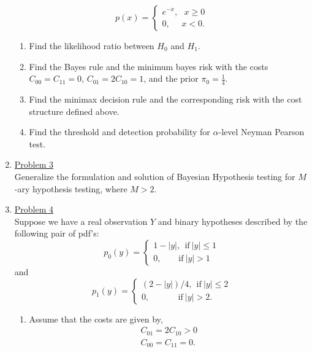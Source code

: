 \documentclass[a4paper,english,10pt]{article}
\begin{document}
\begin{enumerate}
\begin{equation*}
	p(x)=\begin{cases}
		e^{-x},~~~x\geq 0\\
		0,~~~~~~x<0.
	\end{cases}	
\end{equation*}
\begin{enumerate}
\item Find the likelihood ratio between $H_0$ and $H_1$.
\item Find the Bayes rule and the minimum bayes risk with the costs $C_{00}=C_{11}=0$, $C_{01}=2C_{10}=1$, and the prior $\pi_0=\frac{1}{4}$.
\item Find the minimax decision rule and the corresponding risk with the cost structure defined above.
\item Find the threshold and detection probability for $\alpha$-level Neyman Pearson test.
\end{enumerate}
\item \hyperlink{solution3}{Problem 3}\\ 
Generalize the formulation and solution of Bayesian Hypothesis testing for $M$-ary hypothesis testing, where $M>2$.
\item \hyperlink{solution4}{Problem 4}\\
Suppose we have a real observation $Y$ and binary hypotheses described by the following pair of pdf's:
\begin{equation}\nonumber
p_0(y)=\begin{cases}
1-|y|,~~\mbox{if}~|y|\leq 1\\
0,~~~~~~~~~\mbox{if}~|y|> 1
\end{cases}
\end{equation}
and
\begin{equation}\nonumber
p_1(y)=\begin{cases}
(2-|y|)/4,~~\mbox{if}~|y|\leq 2\\
0,~~~~~~~~~~~~~~~\mbox{if}~|y|> 2.
\end{cases}
\end{equation}
\begin{enumerate}
\item Assume that the costs are given by,
\begin{eqnarray*}
	C_{01}=2C_{10} >0\\
	C_{00}=C_{11}=0.
\end{eqnarray*}

\end{enumerate}
\end{enumerate}
\end{document}
